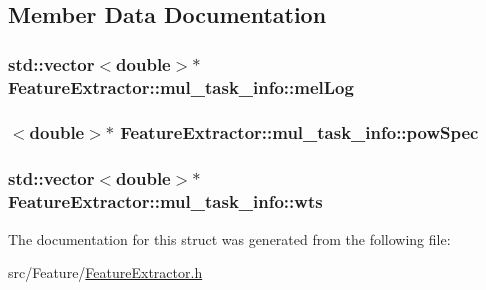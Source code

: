 \subsection{Member Data Documentation}
\hypertarget{struct_feature_extractor_1_1mul__task__info_ae8fb75892001ccf72456314e79d2d0c1}{
\subsubsection[{mel\+Log}]{\setlength{\rightskip}{0pt plus 5cm}std\+::vector$<$double$>$$\ast$ Feature\+Extractor\+::mul\+\_\+task\+\_\+info\+::mel\+Log}}\label{struct_feature_extractor_1_1mul__task__info_ae8fb75892001ccf72456314e79d2d0c1}
\hypertarget{struct_feature_extractor_1_1mul__task__info_a063fda4da896cda16a8e1b92cbcc0b7d}{
\subsubsection[{pow\+Spec}]{$<$double$>$$\ast$ Feature\+Extractor\+::mul\+\_\+task\+\_\+info\+::pow\+Spec}}\label{struct_feature_extractor_1_1mul__task__info_a063fda4da896cda16a8e1b92cbcc0b7d}
\hypertarget{struct_feature_extractor_1_1mul__task__info_a368bf146058e8e717b3e3b9edf36d9a4}{
\subsubsection[{wts}]{\setlength{\rightskip}{0pt plus 5cm}std\+::vector$<$double$>$$\ast$ Feature\+Extractor\+::mul\+\_\+task\+\_\+info\+::wts}}\label{struct_feature_extractor_1_1mul__task__info_a368bf146058e8e717b3e3b9edf36d9a4}


The documentation for this struct was generated from the following file\+:\begin{DoxyCompactItemize}
\item 
src/\+Feature/\hyperlink{_feature_extractor_8h}{Feature\+Extractor.\+h}\end{DoxyCompactItemize}
